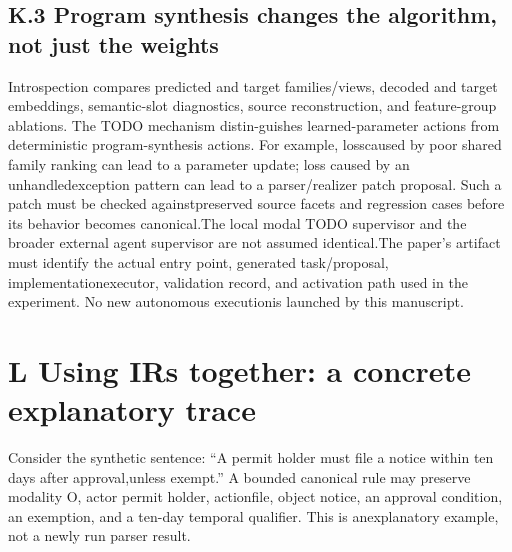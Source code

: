 \subsection*{K.3  Program synthesis changes the algorithm, not just the weights}
\noindent
Introspection compares predicted and target families/views, decoded and target embeddings, semantic-\linebreak[4]
slot diagnostics, source reconstruction, and feature-group ablations. The TODO mechanism distin-\linebreak[4]
guishes learned-parameter actions from deterministic program-synthesis actions. For example, loss\linebreak[4]
caused by poor shared family ranking can lead to a parameter update; loss caused by an unhandled\linebreak[4]
exception pattern can lead to a parser/realizer patch proposal. Such a patch must be checked against\linebreak[4]
preserved source facets and regression cases before its behavior becomes canonical.\linebreak[4]
The local modal TODO supervisor and the broader external agent supervisor are not assumed identical.\linebreak[4]
The paper's artifact must identify the actual entry point, generated task/proposal, implementation\linebreak[4]
executor, validation record, and activation path used in the experiment. No new autonomous execution\linebreak[4]
is launched by this manuscript.\par

\section*{L  Using IRs together: a concrete explanatory trace}
\noindent
Consider the synthetic sentence: ``A permit holder must file a notice within ten days after approval,\linebreak[4]
unless exempt.'' A bounded canonical rule may preserve modality O, actor permit holder, action\linebreak[4]
file, object notice, an approval condition, an exemption, and a ten-day temporal qualifier. This is an\linebreak[4]
explanatory example, not a newly run parser result.\par


